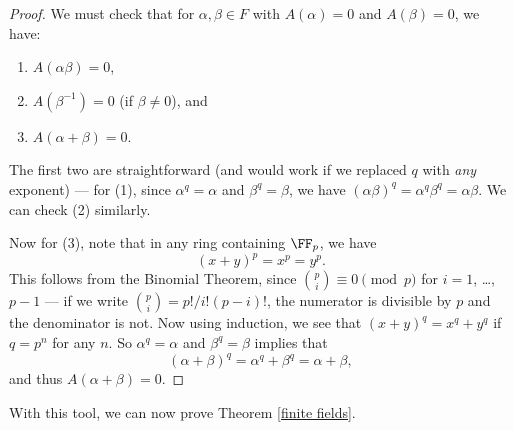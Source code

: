 \begin{proof}
We must check that for $\alpha, \beta \in F$ with $A(\alpha) = 0$ and $A(\beta) = 0$, we have: 
\begin{enumerate}[label=(\arabic*)]
\item $A(\alpha\beta) = 0$,
\item $A(\beta^{-1}) = 0$ (if $\beta \neq 0$), and
\item $A(\alpha + \beta) = 0$. 
\end{enumerate}
The first two are straightforward (and would work if we replaced $q$ with \emph{any} exponent) --- for (1), since $\alpha^q = \alpha$ and $\beta^q = \beta$, we have $(\alpha\beta)^q = \alpha^q\beta^q = \alpha\beta$. We can check (2) similarly. 


Now for (3), note that in any ring containing $\FF_p$, we have \[(x + y)^p = x^p = y^p.\] This follows from the Binomial Theorem, since $\binom{p}{i} \equiv 0 \pmod{p}$ for $i = 1$, \ldots, $p - 1$ --- if we write $\binom{p}{i} = p!/i!(p - i)!$, the numerator is divisible by $p$ and the denominator is not. Now using induction, we see that $(x + y)^q = x^q + y^q$ if $q = p^n$ for any $n$. So $\alpha^q = \alpha$ and $\beta^q = \beta$ implies that \[(\alpha + \beta)^q = \alpha^q + \beta^q = \alpha + \beta,\] and thus $A(\alpha + \beta) = 0$.
\end{proof}
 
With this tool, we can now prove Theorem \ref{finite fields}. 
 
